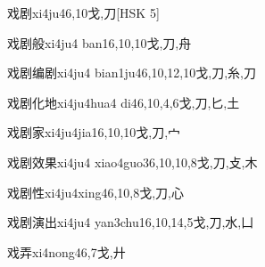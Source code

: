 \begin{EntryWithPhonetic}{戏剧}{xi4ju4}{6,10}{⼽,⼑}[HSK 5]
\end{EntryWithPhonetic}

\begin{EntryWithPhonetic}{戏剧般}{xi4ju4 ban1}{6,10,10}{⼽,⼑,⾈}
\end{EntryWithPhonetic}

\begin{EntryWithPhonetic}{戏剧编剧}{xi4ju4 bian1ju4}{6,10,12,10}{⼽,⼑,⽷,⼑}
\end{EntryWithPhonetic}

\begin{EntryWithPhonetic}{戏剧化地}{xi4ju4hua4 di4}{6,10,4,6}{⼽,⼑,⼔,⼟}
\end{EntryWithPhonetic}

\begin{EntryWithPhonetic}{戏剧家}{xi4ju4jia1}{6,10,10}{⼽,⼑,⼧}
\end{EntryWithPhonetic}

\begin{EntryWithPhonetic}{戏剧效果}{xi4ju4 xiao4guo3}{6,10,10,8}{⼽,⼑,⽁,⽊}
\end{EntryWithPhonetic}

\begin{EntryWithPhonetic}{戏剧性}{xi4ju4xing4}{6,10,8}{⼽,⼑,⼼}
\end{EntryWithPhonetic}

\begin{EntryWithPhonetic}{戏剧演出}{xi4ju4 yan3chu1}{6,10,14,5}{⼽,⼑,⽔,⼐}
\end{EntryWithPhonetic}

\begin{EntryWithPhonetic}{戏弄}{xi4nong4}{6,7}{⼽,⼶}
\end{EntryWithPhonetic}

